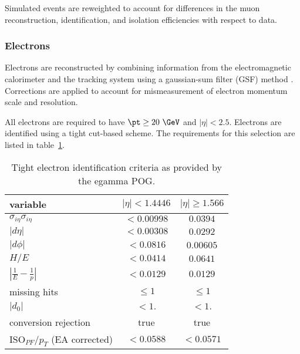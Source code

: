 Simulated events are reweighted to account for differences in the muon
reconstruction, identification, and isolation efficiencies with respect
to data.

\FloatBarrier
\subsubsection{Electrons}
\label{sec:electrons}

Electrons are reconstructed by combining information from the
electromagnetic calorimeter and the tracking system using a gaussian-sum
filter (GSF) method \cite{Baffioni:2006cd}.  Corrections are applied to
account for mismeasurement of electron momentum scale and resolution. 

All electrons are required to have $\pt \geq 20~\GeV$ and $|\eta| <
2.5$.  Electrons are identified using a tight cut-based scheme.  The
requirements for this selection are listed in
table~\ref{tab:electron_id}.

\begin{table}[h]
    \begin{center}
    \caption{Tight electron identification criteria as provided by the
    egamma POG.
    \label{tab:electron_id}}
    \begin{tabular}{l|c|c}
    variable                          & $|\eta| < 1.4446$ & $|\eta| \geq 1.566$ \\
    \hline
    $\sigma_{i\eta}\sigma_{i\eta}$    & $<0.00998$        & $0.0394$            \\
    $|d\eta|$                         & $<0.00308$        & $0.0292$            \\
    $|d\phi|$                         & $<0.0816$         & $0.00605$           \\
    $H/E$                             & $<0.0414$         & $0.0641$            \\
    $|\frac{1}{E} - \frac{1}{p}|$     & $<0.0129$         & $0.0129$            \\
    missing hits                      & $\leq 1$          & $\leq 1$            \\
    $|d_{0}|$                         & $<1.$             & $<1.$               \\
    \hline
    conversion rejection              & true              & true                \\
    ISO$_{PF}$/$p_{T}$ (EA corrected) & $< 0.0588$        & $<0.0571$           \\
    \end{tabular}
    \end{center}
\end{table}


